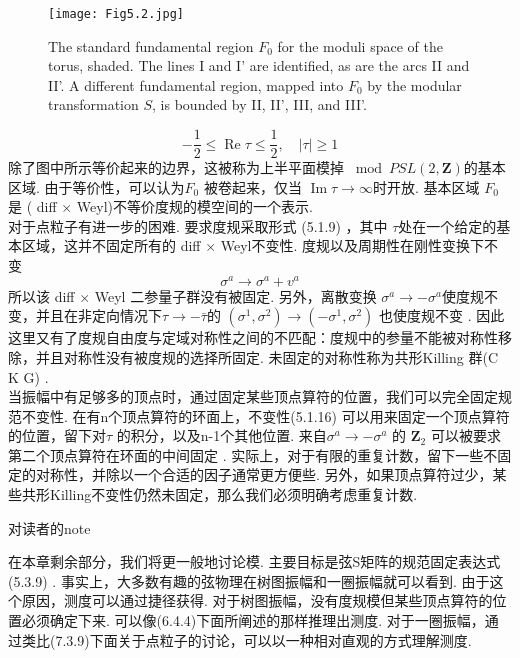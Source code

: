 \begin{figure}
	\begin{center}
		\texttt{[image: Fig5.2.jpg]}\\
		\caption{The standard fundamental region $F_{0}$ for the moduli space of the torus, shaded. The lines I and I' are identified, as are the arcs II and II'. A different fundamental region, mapped into $F_{0}$ by the modular transformation $S$, is bounded by II, II', III, and III'.}\label{Fig5.2}
	\end{center}
\end{figure}

\begin{equation}
	-\frac{1}{2} \leq \operatorname{Re} \tau \leq \frac{1}{2}, \quad|\tau| \geq 1
\end{equation}
除了图中所示等价起来的边界，这被称为上半平面模掉 $\bmod P S L(2, \mathbf{Z})$的基本区域. 由于等价性，可以认为$F_{0}$ 被卷起来，仅当 $\operatorname{Im} \tau \rightarrow \infty$时开放. 基本区域 $F_{0}$ 是 ( diff $\times$ Weyl)不等价度规的模空间的一个表示.\\
对于点粒子有进一步的困难. 要求度规采取形式 (5.1.9) ，其中 $\tau$处在一个给定的基本区域，这并不固定所有的 diff $\times$ Weyl不变性. 度规以及周期性在刚性变换下不变
\begin{equation}
	\sigma^{a} \rightarrow \sigma^{a}+v^{a}
\end{equation}
所以该 diff $\times$ Weyl 二参量子群没有被固定. 另外，离散变换 $\sigma^{a} \rightarrow-\sigma^{a}$使度规不变，并且在非定向情况下$\tau \rightarrow-\bar{\tau}$的 $\left(\sigma^{1}, \sigma^{2}\right) \rightarrow\left(-\sigma^{1}, \sigma^{2}\right)$ 也使度规不变 . 因此这里又有了度规自由度与定域对称性之间的不匹配：度规中的参量不能被对称性移除，并且对称性没有被度规的选择所固定. 未固定的对称性称为共形Killing 群(C K G) .\\
当振幅中有足够多的顶点时，通过固定某些顶点算符的位置，我们可以完全固定规范不变性. 在有n个顶点算符的环面上，不变性(5.1.16) 可以用来固定一个顶点算符的位置，留下对$\tau$ 的积分，以及n-1个其他位置.  来自$\sigma^{a} \rightarrow-\sigma^{a}$ 的 $\mathbf{Z}_{2}$ 可以被要求第二个顶点算符在环面的中间固定 . 实际上，对于有限的重复计数，留下一些不固定的对称性，并除以一个合适的因子通常更方便些. 另外，如果顶点算符过少，某些共形Killing不变性仍然未固定，那么我们必须明确考虑重复计数.\\

\centerline{\Large 对读者的note}
在本章剩余部分，我们将更一般地讨论模. 主要目标是弦S矩阵的规范固定表达式 (5.3.9) . 事实上，大多数有趣的弦物理在树图振幅和一圈振幅就可以看到. 由于这个原因，测度可以通过捷径获得. 对于树图振幅，没有度规模但某些顶点算符的位置必须确定下来. 可以像(6.4.4)下面所阐述的那样推理出测度. 对于一圈振幅，通过类比(7.3.9)下面关于点粒子的讨论，可以以一种相对直观的方式理解测度. 

